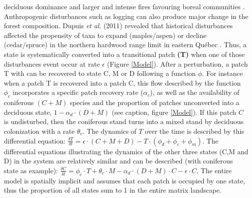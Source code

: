 deciduous dominance and larger and intense fires favouring boreal communities
\cite{Bergeron2004}. Anthropogenic disturbances such as logging can also
produce major change in the forest composition. Dupuis \textit{et al.} (2011)
revealed that historical disturbances affected the propensity of taxa to
expand (maples/aspen) or decline (cedar/spruce) in the northern hardwood range
limit in eastern Québec \cite{Dupuis2011}. Thus, a state is systematically
converted into a transitional patch \textbf{(T)} when one of those disturbances
event occur at rate $\epsilon$ (Figure \ref{Model}). After a perturbation, a
patch T with can be recovered to state C, M or D following a function $\phi$.
For instance when a patch T is recovered into a patch C, this flow described by
the function $\phi_c$ incorporates a specific patch recovery rate ($\alpha_c$),
as well as the availability of coniferous $(C + M)$ species and the proportion of
patches unconverted into a deciduous state, $1- \alpha_d \cdot (D + M)$
(see caption, figure \ref{Model}). If this patch $C$ is undisturbed, then the
coniferous stand turns into a mixed stand by deciduous colonization with a
rate $\theta_c$. 
The dynamics of $T$ over the time is described by this
differential equation: $\frac{\delta T}{\delta t} = \epsilon \cdot (C+M+D) - T
\cdot (\phi_d + \phi_c + \phi_m)$. The differential equations illustrating the
dynamics of the other three states (C,M and D) in the system are relatively
similar and can be described (with coniferous state as example): $\frac{\delta
C}{\delta t} = \phi_c \cdot T + \theta_c \cdot M - \alpha_d \cdot (D+M)\cdot C
- \epsilon \cdot C$. The entire model is spatially implicit and assumes that
each patch is occupied by one state, thus the proportion of all states sum to
1 in the entire matrix landscape. \\

